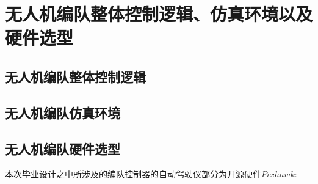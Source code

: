 \chapter{无人机编队整体控制逻辑、仿真环境以及硬件选型}
\label{chap:hardware}
\section{无人机编队整体控制逻辑}
\section{无人机编队仿真环境}
\section{无人机编队硬件选型}
本次毕业设计之中所涉及的编队控制器的自动驾驶仪部分为开源硬件$Pixhawk$:
